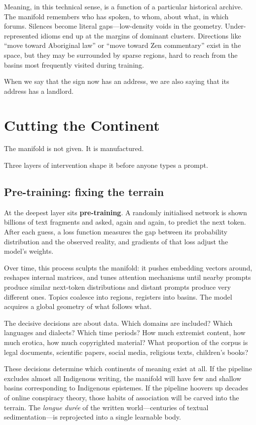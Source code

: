 \documentclass[12pt,a4paper]{article}
\begin{document}
Meaning, in this technical sense, is a function of a particular historical archive. The manifold remembers who has spoken, to whom, about what, in which forums. Silences become literal gaps---low-density voids in the geometry. Under-represented idioms end up at the margins of dominant clusters. Directions like ``move toward Aboriginal law'' or ``move toward Zen commentary'' exist in the space, but they may be surrounded by sparse regions, hard to reach from the basins most frequently visited during training.

When we say that the sign now has an address, we are also saying that its address has a landlord.

\section{Cutting the Continent}

The manifold is not given. It is manufactured.

Three layers of intervention shape it before anyone types a prompt.

\subsection*{Pre-training: fixing the terrain}

At the deepest layer sits \textbf{pre-training}. A randomly initialised network is shown billions of text fragments and asked, again and again, to predict the next token. After each guess, a loss function measures the gap between its probability distribution and the observed reality, and gradients of that loss adjust the model's weights.

Over time, this process sculpts the manifold: it pushes embedding vectors around, reshapes internal matrices, and tunes attention mechanisms until nearby prompts produce similar next-token distributions and distant prompts produce very different ones. Topics coalesce into regions, registers into basins. The model acquires a global geometry of what follows what.

The decisive decisions are about data. Which domains are included? Which languages and dialects? Which time periods? How much extremist content, how much erotica, how much copyrighted material? What proportion of the corpus is legal documents, scientific papers, social media, religious texts, children's books?

These decisions determine which continents of meaning exist at all. If the pipeline excludes almost all Indigenous writing, the manifold will have few and shallow basins corresponding to Indigenous epistemes. If the pipeline hoovers up decades of online conspiracy theory, those habits of association will be carved into the terrain. The \emph{longue dur\'{e}e} of the written world---centuries of textual sedimentation---is reprojected into a single learnable body.
\end{document}
